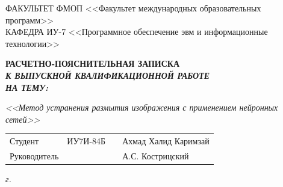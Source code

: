 \begin{titlepage}
	{
		\small \raggedright
		ФАКУЛЬТЕТ ФМОП <<Факультет международных образовательных программ>> \\
		\vspace{3.3mm}
		КАФЕДРА ИУ-7 <<Программное обеспечение эвм и информационные технологии>> \\
	}
	
	\vspace{20.8mm}

	{
		\LARGE \bfseries
		РАСЧЕТНО-ПОЯСНИТЕЛЬНАЯ ЗАПИСКА \\
	}
	\vspace{5mm}
	{
		\Large \bfseries \itshape
		К ВЫПУСКНОЙ КВАЛИФИКАЦИОННОЙ РАБОТЕ \\
		\vspace{5mm}
		НА ТЕМУ: \\
	}
	
	{
		\Large \itshape
		<<Метод устранения размытия изображения с применением нейронных сетей>>
	}
	
	\vfill
	
	\begin{tabular}{p{}PPT}
		Студент &  ИУ7И-84Б & \uline{} & Ахмад Халид Каримзай \\
		Руководитель & ~ &  \uline{} & А.С. Кострицский \\
	\end{tabular}
	
	\vspace{14mm}
	
	\textit{{\the\year} г.}
	
\end{titlepage}